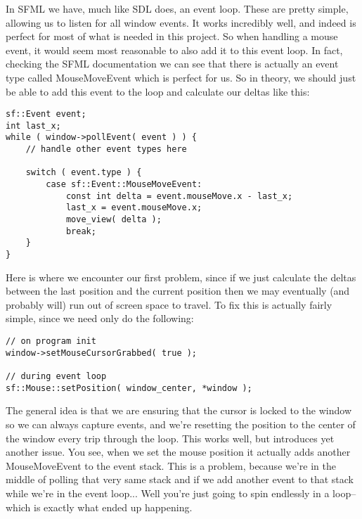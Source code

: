 \documentclass{article}
\begin{document}
In SFML we have, much like SDL does, an event loop. These are pretty simple,
allowing us to listen for all window events. It works incredibly well, and
indeed is perfect for most of what is needed in this project. So when handling a
mouse event, it would seem most reasonable to also add it to this event loop. In
fact, checking the SFML documentation we can see that there is actually an event
type called MouseMoveEvent which is perfect for us. So in theory, we should just
be able to add this event to the loop and calculate our deltas like this:

\begin{verbatim}
sf::Event event;
int last_x;
while ( window->pollEvent( event ) ) {
    // handle other event types here

    switch ( event.type ) {
        case sf::Event::MouseMoveEvent:
            const int delta = event.mouseMove.x - last_x;
            last_x = event.mouseMove.x;
            move_view( delta );
            break;
    }
}
\end{verbatim}

Here is where we encounter our first problem, since if we just calculate the
deltas between the last position and the current position then we may eventually
(and probably will) run out of screen space to travel. To fix this is actually
fairly simple, since we need only do the following:

\begin{verbatim}
// on program init
window->setMouseCursorGrabbed( true );

// during event loop
sf::Mouse::setPosition( window_center, *window );
\end{verbatim}

The general idea is that we are ensuring that the cursor is locked to the window
so we can always capture events, and we're resetting the position to the center
of the window every trip through the loop. This works well, but introduces yet
another issue. You see, when we set the mouse position it actually adds another
MouseMoveEvent to the event stack. This is a problem, because we're in the
middle of polling that very same stack and if we add another event to that stack
while we're in the event loop... Well you're just going to spin endlessly in a
loop--which is exactly what ended up happening.
\end{document}
